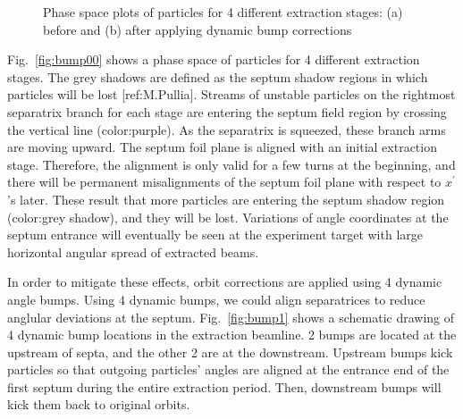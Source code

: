 \documentclass[aps,prstab,onecolumn,preprint,nofootinbib]{revtex4-1}
\begin{document}
\begin{figure}[tbh!]
  \begin{center}
    \caption{\label{fig:bump0}Phase space plots of particles for 4 different extraction stages: (a) before and (b) after applying dynamic bump corrections}
  \end{center}
\end{figure}

Fig.~\ref{fig:bump00} shows a phase space of particles for 4 different extraction stages.
The grey shadows are defined as the septum shadow regions in which particles will be lost [ref:M.Pullia].
Streams of unstable particles on the rightmost separatrix branch for each stage are entering the septum field region by crossing the vertical line (color:purple).
As the separatrix is squeezed, these branch arms are moving upward.
The septum foil plane is aligned with an initial extraction stage.
Therefore, the alignment is only valid for a few turns at the beginning, and there will be permanent misalignments of the septum foil plane with respect to $x^{\prime}$'s later.
These result that more particles are entering the septum shadow region (color:grey shadow), and they will be lost.
Variations of angle coordinates at the septum entrance will eventually be seen at the experiment target with large horizontal angular spread of extracted beams.

In order to mitigate these effects, orbit corrections are applied using 4 dynamic angle bumps.
Using 4 dynamic bumps, we could align separatrices to reduce anglular deviations at the septum.
Fig.~\ref{fig:bump1} shows a schematic drawing of 4 dynamic bump locations in the extraction beamline.
2 bumps are located at the upstream of septa, and the other 2 are at the downstream.
Upstream bumps kick particles so that outgoing particles' angles are aligned at the entrance end of the first septum during the entire extraction period.
Then, downstream bumps will kick them back to original orbits.
\end{document}
